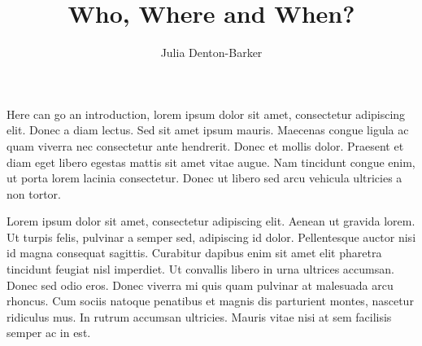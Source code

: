 \documentclass[a4paper]{article}
\title{Who, Where and When?}
\author{Julia Denton-Barker}
\begin{document}
\maketitle
\tableofcontents

Here can go an introduction, lorem ipsum dolor sit amet, consectetur adipiscing elit. Donec a diam lectus. Sed sit amet ipsum mauris. Maecenas congue ligula ac quam viverra nec consectetur ante hendrerit. Donec et mollis dolor. Praesent et diam eget libero egestas mattis sit amet vitae augue. Nam tincidunt congue enim, ut porta lorem lacinia consectetur. Donec ut libero sed arcu vehicula ultricies a non tortor.

Lorem ipsum dolor sit amet, consectetur adipiscing elit. Aenean ut gravida lorem. Ut turpis felis, pulvinar a semper sed, adipiscing id dolor. Pellentesque auctor nisi id magna consequat sagittis. Curabitur dapibus enim sit amet elit pharetra tincidunt feugiat nisl imperdiet. Ut convallis libero in urna ultrices accumsan. Donec sed odio eros. Donec viverra mi quis quam pulvinar at malesuada arcu rhoncus. Cum sociis natoque penatibus et magnis dis parturient montes, nascetur ridiculus mus. In rutrum accumsan ultricies. Mauris vitae nisi at sem facilisis semper ac in est.



\end{document}
